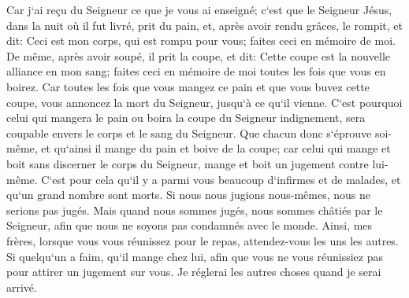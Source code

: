 \verse Car j`ai reçu du Seigneur ce que je vous ai enseigné; c`est que le Seigneur Jésus, dans la nuit où il fut livré, prit du pain, 
\verse et, après avoir rendu grâces, le rompit, et dit: Ceci est mon corps, qui est rompu pour vous; faites ceci en mémoire de moi. 
\verse De même, après avoir soupé, il prit la coupe, et dit: Cette coupe est la nouvelle alliance en mon sang; faites ceci en mémoire de moi toutes les fois que vous en boirez. 
\verse Car toutes les fois que vous mangez ce pain et que vous buvez cette coupe, vous annoncez la mort du Seigneur, jusqu`à ce qu`il vienne. 
\verse C`est pourquoi celui qui mangera le pain ou boira la coupe du Seigneur indignement, sera coupable envers le corps et le sang du Seigneur. 
\verse Que chacun donc s`éprouve soi-même, et qu`ainsi il mange du pain et boive de la coupe; 
\verse car celui qui mange et boit sans discerner le corps du Seigneur, mange et boit un jugement contre lui-même. 
\verse C`est pour cela qu`il y a parmi vous beaucoup d`infirmes et de malades, et qu`un grand nombre sont morts. 
\verse Si nous nous jugions nous-mêmes, nous ne serions pas jugés. 
\verse Mais quand nous sommes jugés, nous sommes châtiés par le Seigneur, afin que nous ne soyons pas condamnés avec le monde. 
\verse Ainsi, mes frères, lorsque vous vous réunissez pour le repas, attendez-vous les uns les autres. 
\verse Si quelqu`un a faim, qu`il mange chez lui, afin que vous ne vous réunissiez pas pour attirer un jugement sur vous. Je réglerai les autres choses quand je serai arrivé. 

\chapter{}

